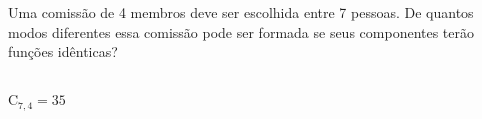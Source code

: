 \begin{ex}
Uma comissão de 4 membros deve ser escolhida entre 7 pessoas. De quantos modos diferentes essa comissão pode ser formada se seus componentes terão funções idênticas?
  \begin{sol}
     \phantom{A} \\
     $\mathrm{C}_{7,4}=35$
  \end{sol}
\end{ex}